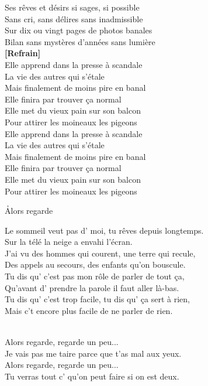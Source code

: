 \documentclass{novel}
\begin{document}
\begin{multicols}{2}
Ses rêves et désirs si sages, si possible\\
Sans cri, sans délires sans inadmissible\\
Sur dix ou vingt pages de photos banales\\
Bilan sans mystères d'années sans lumière\\

\textbf{[Refrain]}
\\

Elle apprend dans la presse à scandale\\
La vie des autres qui s'étale\\
Mais finalement de moins pire en banal\\
Elle finira par trouver ça normal\\

Elle met du vieux pain sur son balcon\\
Pour attirer les moineaux les pigeons\\

Elle apprend dans la presse à scandale\\
La vie des autres qui s'étale\\
Mais finalement de moins pire en banal\\
Elle finira par trouver ça normal\\

Elle met du vieux pain sur son balcon\\
Pour attirer les moineaux les pigeons
\end{multicols}

\newpage
\normalsize
\h*{Alors regarde}

Le sommeil veut pas d' moi, tu rêves depuis longtemps.\\
Sur la télé la neige a envahi l'écran.\\
J'ai vu des hommes qui courent, une terre qui recule,\\
Des appels au secours, des enfants qu'on bouscule.\\
Tu dis qu' c'est pas mon rôle de parler de tout ça,\\
Qu'avant d' prendre la parole il faut aller là-bas.\\
Tu dis qu' c'est trop facile, tu dis qu' ça sert à rien,\\
Mais c't encore plus facile de ne parler de rien.\\

\begin{bfseries}
[Refrain:]\\
Alors regarde, regarde un peu...\\
Je vais pas me taire parce que t'as mal aux yeux.\\
Alors regarde, regarde un peu...\\
Tu verras tout c' qu'on peut faire si on est deux.\\
\end{bfseries}
\end{document}
